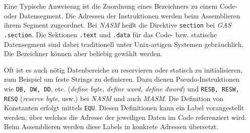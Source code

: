 Eine Typische Anweisung ist die Zuordnung eines Bezeichners zu einem Code- oder
Datensegment. Die Adressen der Instruktionen werden beim Assemblieren ihrem
Segment zugeordnet. Bei \emph{NASM} heißt die Direktive \texttt{section}
bei \emph{GAS} \texttt{.section}. Die Sektionen \texttt{.text} und
\texttt{.data} für das Code- bzw. statische Datensegment sind dabei traditionell
unter Unix-artigen Systemen gebräuchlich. Die Bezeichner können aber
beliebig gewählt werden.

Oft ist es auch nötig Datenbereiche zu reservieren oder statisch zu
initialisieren, zum Beispiel um feste Strings zu definieren. Dazu dienen
Pseudo-Instruktionen wie \texttt{DB, DW, DD}, etc. (\emph{define byte, define
word, define dword}) und \texttt{RESB, RESW, RESQ} (\emph{reserve byte}, usw.)
bei \emph{NASM} und auch \emph{MASM}. Die Definition von Konstanten erfolgt mittels
\texttt{EQU}. Diesen Definitionen kann ein Label vorangestellt werden, über
welches die Adresse der jeweiligen Daten im Code referenziert wird. Beim
Assemblieren werden diese Labels in konkrete Adressen übersetzt.

